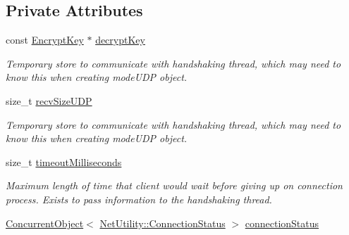 \subsection*{Private Attributes}
\begin{DoxyCompactItemize}
\item 
\hypertarget{class_net_instance_client_abfd45e00771b132f08c2aea9bf582a3e}{
const \hyperlink{class_encrypt_key}{EncryptKey} $\ast$ \hyperlink{class_net_instance_client_abfd45e00771b132f08c2aea9bf582a3e}{decryptKey}}
\label{class_net_instance_client_abfd45e00771b132f08c2aea9bf582a3e}

\begin{DoxyCompactList}\small\item\em Temporary store to communicate with handshaking thread, which may need to know this when creating modeUDP object. \item\end{DoxyCompactList}\item 
\hypertarget{class_net_instance_client_af10315644a2c7ffd820d8a6b2ad0f504}{
size\_\-t \hyperlink{class_net_instance_client_af10315644a2c7ffd820d8a6b2ad0f504}{recvSizeUDP}}
\label{class_net_instance_client_af10315644a2c7ffd820d8a6b2ad0f504}

\begin{DoxyCompactList}\small\item\em Temporary store to communicate with handshaking thread, which may need to know this when creating modeUDP object. \item\end{DoxyCompactList}\item 
\hypertarget{class_net_instance_client_a3830bd923adb2bcd574a9e06edf304ce}{
size\_\-t \hyperlink{class_net_instance_client_a3830bd923adb2bcd574a9e06edf304ce}{timeoutMilliseconds}}
\label{class_net_instance_client_a3830bd923adb2bcd574a9e06edf304ce}

\begin{DoxyCompactList}\small\item\em Maximum length of time that client would wait before giving up on connection process. Exists to pass information to the handshaking thread. \item\end{DoxyCompactList}\item 
\hypertarget{class_net_instance_client_ab03cb69d1c904f442b29e1f4665c3be7}{
\hyperlink{class_concurrent_object}{ConcurrentObject}$<$ \hyperlink{class_net_utility_a7eae52138f8bd597ffc67ebf07e86b6d}{NetUtility::ConnectionStatus} $>$ \hyperlink{class_net_instance_client_ab03cb69d1c904f442b29e1f4665c3be7}{connectionStatus}}
\label{class_net_instance_client_ab03cb69d1c904f442b29e1f4665c3be7}


\end{DoxyCompactItemize}
